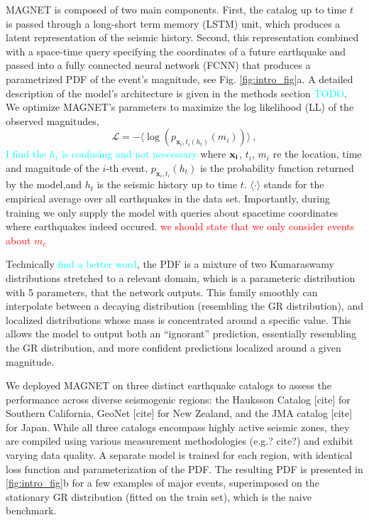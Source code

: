\documentclass[pdflatex]{sn-jnl}
\newcommand{\yohai}[1]{{\textcolor{red}{#1}}}
\newcommand{\neri}[1]{{\textcolor{cyan}{#1}}}
\begin{document}
MAGNET is composed of two main components. First, the catalog up to time $t$ is passed through a long-short term memory (LSTM) unit, which produces a latent representation of the seismic history.
Second, this representation combined with a space-time query specifying the coordinates of a future earthquake and passed into a fully connected neural network (FCNN) that produces a parametrized PDF of the event's magnitude, see Fig. \ref{fig:intro_fig}a. A detailed description of the model's architecture is given in the methods section \neri{TODO}. We optimize MAGNET's parameters to maximize the log likelihood (LL) of the observed magnitudes,
\begin{equation}
    \mathcal{L} = -\langle \log{ \left( p_{\textbf{x}_i, t_i(h_t)} \left( m_i \right) \right) } \rangle\ ,
    \label{eq:loss_function}
\end{equation}
\neri{I find the $h_t$ is confusing and not nescessary}
where $\bf{x}_i$, $t_i$, $m_i$ re the location, time and magnitude of the $i$-th event, $p_{\textbf{x}_i, t_i}(h_t)$ is the probability function returned by the model,and $h_t$ is the seismic history up to time $t$. $\langle \cdot\rangle$ stands for the empirical average over all earthquakes in the data set. Importantly, during training we only supply the model with queries about spacetime coordinates where earthquakes indeed occured. \yohai{we should state that we only consider events about $m_c$}

Technically \neri{find a better word}, the PDF is a mixture of two Kumaraswamy distributions \cite{kumaraswamy_generalized_1980} stretched to a relevant domain, which is a parameteric distribution with 5 parameters, that the network outputs. This family smoothly can interpolate between a decaying distribution (resembling the GR distribution), and localized distributions whose mass is concentrated around a specific value. This allows the model to output both an ``ignorant'' prediction, essentially resembling the GR distribution, and more confident predictions localized around a given magnitude.

We deployed MAGNET on three distinct earthquake catalogs to assess the performance across diverse seismogenic regions: the Hauksson Catalog [cite] for Southern California, GeoNet [cite] for New Zealand, and the JMA catalog [cite] for Japan. While all three catalogs encompass highly active seismic zones, they are compiled using various measurement methodologies (e.g.? cite?) and exhibit varying data quality. A separate model is trained for each region, with identical loss function and parameterization of the PDF. The resulting PDF is presented in \ref{fig:intro_fig}b for a few examples of major events, superimposed on the stationary GR distribution (fitted on the train set), which is the naive benchmark.
\end{document}
